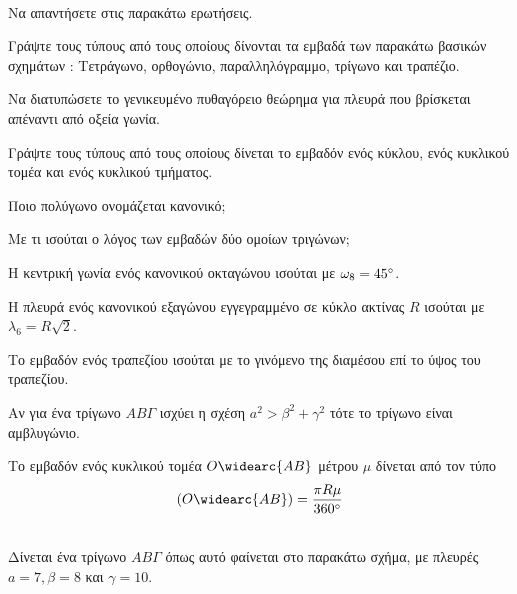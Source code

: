 \documentclass[twoside,nofonts,ektypwsh,math,spyros]{frontisthrio-diag}
\begin{document}
\begin{thema}
\item\mbox{}\\\vspace{-7mm}
\begin{erwthma}
\item Να απαντήσετε στις παρακάτω ερωτήσεις.
\begin{rlist}
\item Γράψτε τους τύπους από τους οποίους δίνονται τα εμβαδά των παρακάτω βασικών σχημάτων : Τετράγωνο, ορθογώνιο, παραλληλόγραμμο, τρίγωνο και τραπέζιο.
\item Να διατυπώσετε το γενικευμένο πυθαγόρειο θεώρημα για πλευρά που βρίσκεται απέναντι από οξεία γωνία.
\item Γράψτε τους τύπους από τους οποίους δίνεται το εμβαδόν ενός κύκλου, ενός κυκλικού τομέα και ενός κυκλικού τμήματος.
\item Ποιο πολύγωνο ονομάζεται κανονικό;
\item Με τι ισούται ο λόγος των εμβαδών δύο ομοίων τριγώνων;
\end{rlist}
\item \swstolathos
\begin{rlist}
\item Η κεντρική γωνία ενός κανονικού οκταγώνου ισούται με $ \omega_8=45\degree $.
\item Η πλευρά ενός κανονικού εξαγώνου εγγεγραμμένο σε κύκλο ακτίνας $ R $ ισούται με $ \lambda_6=R\sqrt{2} $.
\item Το εμβαδόν ενός τραπεζίου ισούται με το γινόμενο της διαμέσου επί το ύψος του τραπεζίου.
\item Αν για ένα τρίγωνο $ AB\varGamma $ ισχύει η σχέση $ a^2>\beta^2+\gamma^2 $ τότε το τρίγωνο είναι αμβλυγώνιο.
\item Το εμβαδόν ενός κυκλικού τομέα $ O\widearc{AB} $ μέτρου $ \mu $ δίνεται από τον τύπο
\[ (O\widearc{AB})=\frac{\pi R\mu}{360\degree} \]
\end{rlist}
\end{erwthma}
\item\mbox{}\\
Δίνεται ένα τρίγωνο $ AB\varGamma $ όπως αυτό φαίνεται στο παρακάτω σχήμα, με πλευρές $ a=7,\beta=8 $ και $ \gamma=10 $.
\begin{center}
\end{center}
\end{thema}
\end{document}
